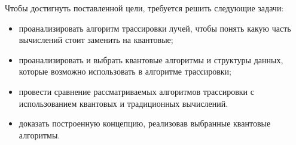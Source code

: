 Чтобы достигнуть поставленной цели, требуется решить следующие задачи:

\begin{itemize}
    \item проанализировать алгоритм трассировки лучей, чтобы
понять какую часть вычислений стоит заменить на квантовые;
    \item проанализировать и выбрать квантовые алгоритмы и структуры данных, которые возможно использовать в алгоритме трассировки;
    \item провести сравнение рассматриваемых алгоритмов трассировки с использованием квантовых и традиционных вычислений.
    \item доказать построенную концепцию, реализовав выбранные квантовые алгоритмы.
\end{itemize}
